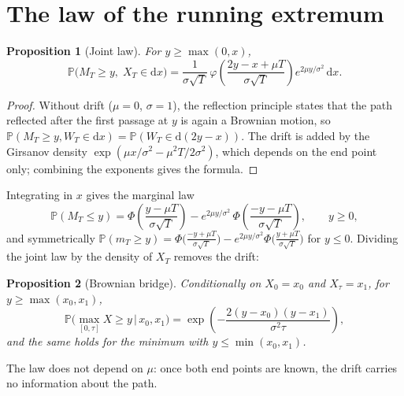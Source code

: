 \documentclass[11pt,a4paper]{article}
\newtheorem{proposition}{Proposition}
\theoremstyle{remark}
\newcommand{\Prob}{\mathbb{P}}
\newcommand{\dd}{\,\mathrm{d}}
\begin{document}
\section{The law of the running extremum}\label{sec:law}
\begin{proposition}[Joint law]\label{prop:joint}
For $y\ge\max(0,x)$,
\begin{equation}
  \Prob\big(M_T\ge y,\;X_T\in\mathrm dx\big)=\frac{1}{\sigma\sqrt T}\,\varphi\!\left(\frac{2y-x+\mu T}{\sigma\sqrt T}\right)e^{2\mu y/\sigma^2}\dd x .
\end{equation}
\end{proposition}
\begin{proof}
Without drift ($\mu=0$, $\sigma=1$), the reflection principle states that the path reflected after the first passage at $y$
is again a Brownian motion, so $\Prob(M_T\ge y,W_T\in\mathrm dx)=\Prob(W_T\in\mathrm d(2y-x))$. The drift is added by the
Girsanov density $\exp(\mu x/\sigma^2-\mu^2T/2\sigma^2)$, which depends on the end point only; combining the exponents gives
the formula.
\end{proof}
Integrating in $x$ gives the marginal law
\begin{equation}\label{eq:maxlaw}
  \Prob(M_T\le y)=\Phi\!\left(\frac{y-\mu T}{\sigma\sqrt T}\right)-e^{2\mu y/\sigma^2}\,\Phi\!\left(\frac{-y-\mu T}{\sigma\sqrt T}\right),\qquad y\ge0,
\end{equation}
and symmetrically $\Prob(m_T\ge y)=\Phi\big(\frac{-y+\mu T}{\sigma\sqrt T}\big)-e^{2\mu y/\sigma^2}\Phi\big(\frac{y+\mu T}{\sigma\sqrt T}\big)$ for $y\le0$.
Dividing the joint law by the density of $X_T$ removes the drift:
\begin{proposition}[Brownian bridge]\label{prop:bridge}
Conditionally on $X_0=x_0$ and $X_\tau=x_1$, for $y\ge\max(x_0,x_1)$,
\begin{equation}\label{eq:bridge}
  \Prob\Big(\max_{[0,\tau]}X\ge y\,\Big|\,x_0,x_1\Big)=\exp\!\left(-\frac{2(y-x_0)(y-x_1)}{\sigma^2\tau}\right),
\end{equation}
and the same holds for the minimum with $y\le\min(x_0,x_1)$.
\end{proposition}
The law does not depend on $\mu$: once both end points are known, the drift carries no information about the path.

\end{document}
